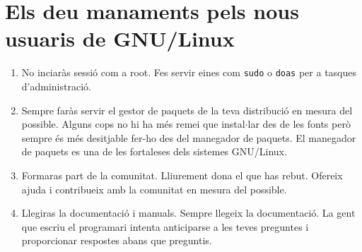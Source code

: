 \documentclass[a4paper]{article}
\begin{document}
\section*{Els deu manaments pels nous usuaris de GNU/Linux}

\begin{enumerate}
    \item No inciaràs sessió com a root. Fes servir eines com \texttt{sudo} o \texttt{doas} per a tasques d'administració.

    \item Sempre faràs servir el gestor de paquets de la teva distribució en mesura del possible. Alguns cops no hi ha més remei que instal$\cdot$lar des de les fonts però sempre és més desitjable fer-ho des del manegador de paquets. El manegador de paquets es una de les fortaleses dels sistemes GNU/Linux.

    \item Formaras part de la comunitat. Lliurement dona el que has rebut. Ofereix ajuda i contribueix amb la comunitat en mesura del possible.
    \item Llegiras la documentació i manuals. Sempre llegeix la documentació. La gent que escriu el programari intenta anticiparse a les teves preguntes i proporcionar respostes abans que preguntis.

\end{enumerate}
\end{document}
